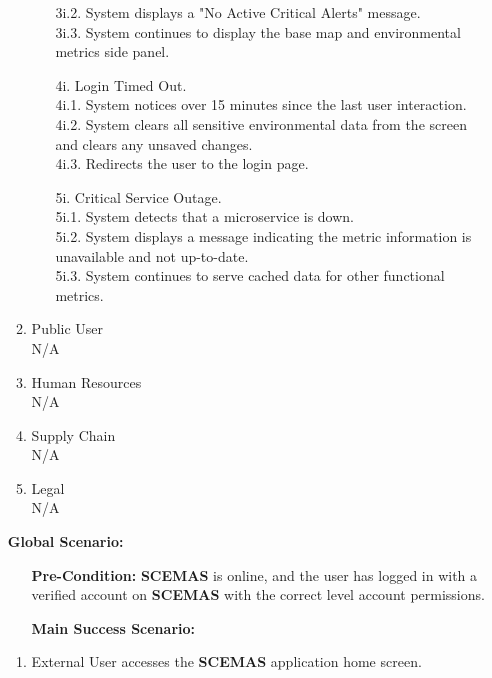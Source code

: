 \documentclass[]{article}
\begin{document}
\begin{enumerate}[{\bf BE1.}]
\begin{enumerate}[{\bf VP1.}]
\begin{itemize}
				\hspace{1cm}3i.2. System displays a "No Active Critical Alerts" message. \\
				\hspace{1cm}3i.3. System continues to display the base map and environmental metrics side panel.
				\item[4i.] Login Timed Out. \\
				\hspace{1cm}4i.1. System notices over 15 minutes since the last user interaction. \\
				\hspace{1cm}4i.2. System clears all sensitive environmental data from the screen and clears any unsaved changes. \\
				\hspace{1cm}4i.3. Redirects the user to the login page.
				\item[5i.] Critical Service Outage. \\
				\hspace{1cm}5i.1. System detects that a microservice is down. \\
				\hspace{1cm}5i.2. System displays a message indicating the metric information is unavailable and not up-to-date. \\
				\hspace{1cm}5i.3. System continues to serve cached data for other functional metrics.
			\end{itemize}
		\item Public User \\
			N/A
		\item Human Resources \\
			N/A
		\item Supply Chain \\
			N/A
		\item Legal \\
			N/A
		\end{enumerate}
		{\bf Global Scenario:}
		\begin{itemize}
			\item[] {\bf Pre-Condition:} \textbf{SCEMAS} is online, and the user has logged in with a verified account on \textbf{SCEMAS} with the correct level account permissions.
			\item[] {\bf Main Success Scenario:}
		\end{itemize}
		\begin{enumerate}[1.]
			\item External User accesses the \textbf{SCEMAS} application home screen.

\end{enumerate}
\end{enumerate}
\end{document}
